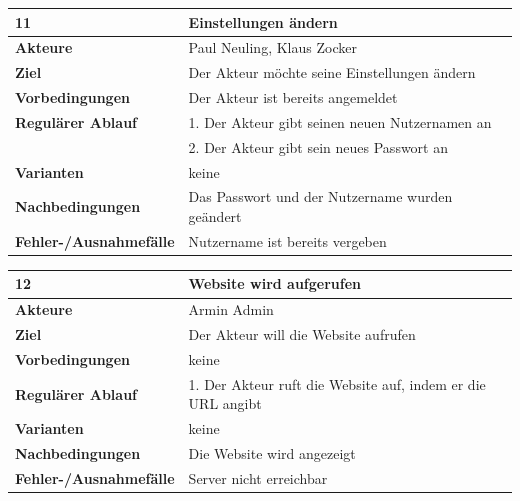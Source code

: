 \documentclass[fontsize=12pt,paper=a4,twoside]{scrartcl}
\begin{document}
\begin{table}
	[H] \label{11} 
	\begin{tabular}
		{|l|p{10cm}|} \hline \textbf{11} & \textbf{Einstellungen ändern} \\
		\hline \textbf{Akteure} & Paul Neuling, Klaus Zocker\\
		\hline \textbf{Ziel} & Der Akteur möchte seine Einstellungen ändern\\
		\hline \textbf{Vorbedingungen} & Der Akteur ist bereits angemeldet\\
		\hline \textbf{Regulärer Ablauf} & 1. Der Akteur gibt seinen neuen Nutzernamen an\\
		&2. Der Akteur gibt sein neues Passwort an\\
		\hline \textbf{Varianten} & keine \\
		\hline \textbf{Nachbedingungen} & Das Passwort und der Nutzername wurden geändert\\
		\hline \textbf{Fehler-/Ausnahmefälle} & Nutzername ist bereits vergeben \\
		\hline 
	\end{tabular}
\end{table}
\begin{table}
	[H] \label{12} 
	\begin{tabular}
		{|l|p{10cm}|} \hline \textbf{12} & \textbf{Website wird aufgerufen} \\
		\hline \textbf{Akteure} & Armin Admin\\
		\hline \textbf{Ziel} & Der Akteur will die Website aufrufen\\
		\hline \textbf{Vorbedingungen} & keine\\
		\hline \textbf{Regulärer Ablauf} & 1. Der Akteur ruft die Website auf, indem er die URL angibt\\
		\hline \textbf{Varianten} & keine \\
		\hline \textbf{Nachbedingungen} & Die Website wird angezeigt\\
		\hline \textbf{Fehler-/Ausnahmefälle} & Server nicht erreichbar \\
		\hline 
	\end{tabular}
\end{table}
\end{document}

